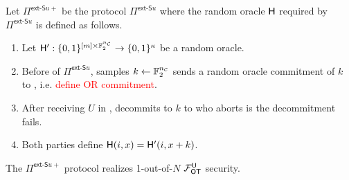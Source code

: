\begin{definition}\label{def:ext_Su_U}
	Let $\Pi^{\textsf{ext-S}u+}$ be the protocol $\Pi^{\textsf{ext-S}u}$ where the random oracle $\mathsf{H}$ required by $\Pi^{\textsf{ext-S}u}$ is defined as follows. 
	\begin{enumerate}
		\item Let $\mathsf{H}':\{0,1\}^{[m]\times \mathbb{F}^{{n_\mathcal{C}}}_2}\rightarrow\{0,1\}^\kappa$ be a random oracle.
		\item Before  of $\Pi^{\textsf{ext-S}u}$, \send samples $k\gets\mathbb{F}^{{n_\mathcal{C}}}_2$ sends a random oracle commitment of $k$ to \rec, i.e. \textcolor{red}{define OR commitment}. 
		\item After receiving $U$ in , \send decommits to $k$ to \rec who aborts is the decommitment fails.
		\item Both parties define $\mathsf{H}(i,x)=\mathsf{H}'(i,x+k)$.
	\end{enumerate}
\end{definition}
\begin{lemma}
	The $\Pi^{\textsf{ext-S}u+}$ protocol realizes 1-out-of-$N$ $\mathcal{F}_{\mathsf{OT}}^\mathsf{U}$ security.
\end{lemma}
